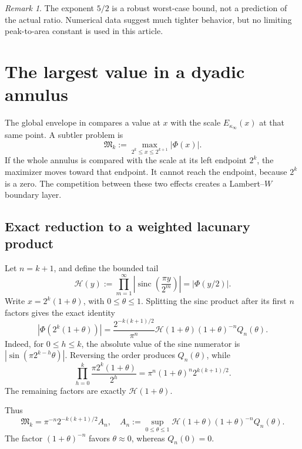 \documentclass[11pt,oneside]{article}
\numberwithin{equation}{section}
\theoremstyle{definition}
\theoremstyle{remark}
\newtheorem{remark}[theorem]{Remark}
\newcommand{\abs}[1]{\left|#1\right|}
\newcommand{\sinc}{\operatorname{sinc}}
\newcommand{\PhiUp}{\Phi}
\newcommand{\defeq}{\mathrel{:=}}
\begin{document}
\begin{remark}
The exponent \(5/2\) is a robust worst-case bound, not a prediction of the actual ratio.
Numerical data suggest much tighter behavior, but no limiting peak-to-area constant is used
in this article.
\end{remark}

\section{The largest value in a dyadic annulus}
\label{sec:annular}

The global envelope in  compares a value at \(x\) with the
scale \(E_{\kappa_\infty}(x)\) at that same point.  A subtler problem is
\begin{equation}
 \mathfrak M_k\defeq
 \max_{2^k\le x\le2^{k+1}}\abs{\PhiUp(x)}.
 \label{eq:annular-M}
\end{equation}
If the whole annulus is compared with the scale at its left endpoint \(2^k\), the maximizer
moves toward that endpoint.  It cannot reach the endpoint, because \(2^k\) is a zero.  The
competition between these two effects creates a Lambert--\(W\) boundary layer.

\subsection{Exact reduction to a weighted lacunary product}

Let \(n=k+1\), and define the bounded tail
\begin{equation}
 \mathcal H(y)
 \defeq\prod_{m=1}^{\infty}
 \abs{\sinc\!\left(\frac{\pi y}{2^m}\right)}
 =\abs{\PhiUp(y/2)}.
 \label{eq:H-tail}
\end{equation}
Write \(x=2^k(1+\theta)\), with \(0\le\theta\le1\).  Splitting the sinc product after its
first \(n\) factors gives the exact identity
\begin{equation}
 \abs{\PhiUp(2^k(1+\theta))}
 =\frac{2^{-k(k+1)/2}}{\pi^n}
   \mathcal H(1+\theta)(1+\theta)^{-n}Q_n(\theta).
 \label{eq:annular-exact}
\end{equation}
Indeed, for \(0\le h\le k\), the absolute value of the sine numerator is
\(\abs{\sin(\pi2^{k-h}\theta)}\).  Reversing the order produces \(Q_n(\theta)\), while
\[
 \prod_{h=0}^{k}\frac{\pi2^k(1+\theta)}{2^h}
 =\pi^n(1+\theta)^n2^{k(k+1)/2}.
\]
The remaining factors are exactly \(\mathcal H(1+\theta)\).

Thus
\begin{equation}
 \mathfrak M_k
 =\pi^{-n}2^{-k(k+1)/2}A_n,
 \quad
 A_n\defeq\sup_{0\le\theta\le1}
 \mathcal H(1+\theta)(1+\theta)^{-n}Q_n(\theta).
 \label{eq:An}
\end{equation}
The factor \((1+\theta)^{-n}\) favors \(\theta\approx0\), whereas \(Q_n(0)=0\).
\end{document}
